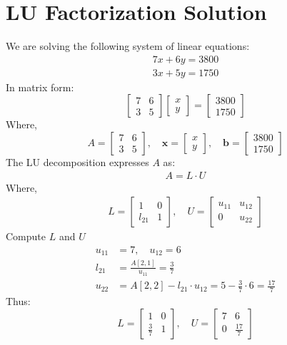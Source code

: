 \documentclass[journal]{IEEEtran}
\begin{document}
\section*{LU Factorization Solution}
We are solving the following system of linear equations:
\begin{align}
7x + 6y = 3800
\end{align}
\begin{align}
3x + 5y = 1750
\end{align}
In matrix form:
\[
\begin{bmatrix}
7 & 6 \\
3 & 5
\end{bmatrix}
\begin{bmatrix}
x \\
y
\end{bmatrix}
=
\begin{bmatrix}
3800 \\
1750
\end{bmatrix}
\]
Where,
\[
A = 
\begin{bmatrix}
7 & 6 \\
3 & 5
\end{bmatrix}, \quad
\mathbf{x} = 
\begin{bmatrix}
x \\
y
\end{bmatrix}, \quad
\mathbf{b} = 
\begin{bmatrix}
3800 \\
1750
\end{bmatrix}
\]
The LU decomposition expresses \(A\) as:
\begin{align}
    A = L \cdot U
\end{align}
Where,
\begin{align}
    L = 
\begin{bmatrix}
1 & 0 \\
l_{21} & 1
\end{bmatrix}, \quad
U = 
\begin{bmatrix}
u_{11} & u_{12} \\
0 & u_{22}
\end{bmatrix}
\end{align}
Compute \(L\) and \(U\)
\begin{align}
u_{11} &= 7, \quad u_{12} = 6 \\
l_{21} &= \frac{A[2,1]}{u_{11}} = \frac{3}{7} \\
u_{22} &= A[2,2] - l_{21} \cdot u_{12} = 5 - \frac{3}{7} \cdot 6 = \frac{17}{7}
\end{align}
Thus:
\[
L = 
\begin{bmatrix}
1 & 0 \\
\frac{3}{7} & 1
\end{bmatrix}, \quad
U = 
\begin{bmatrix}
7 & 6 \\
0 & \frac{17}{7}
\end{bmatrix}
\]
\end{document}
